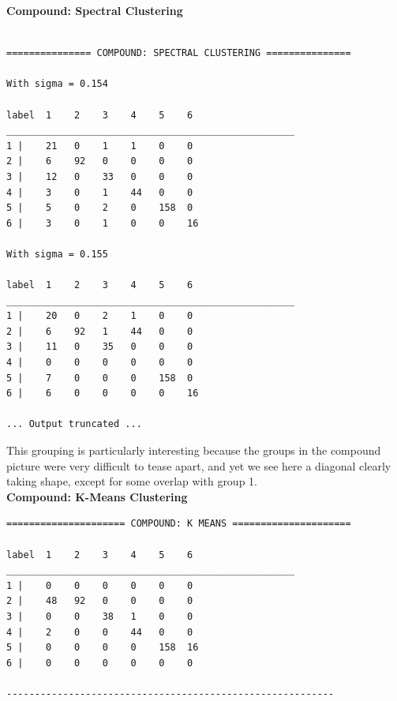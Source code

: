 \documentclass[11pt]{article}
\begin{document}
\textbf{Compound: Spectral Clustering} 
\begin{verbatim}

=============== COMPOUND: SPECTRAL CLUSTERING ===============

With sigma = 0.154

label  1    2    3    4    5    6    
___________________________________________________
1 |    21   0    1    1    0    0    
2 |    6    92   0    0    0    0    
3 |    12   0    33   0    0    0    
4 |    3    0    1    44   0    0    
5 |    5    0    2    0    158  0    
6 |    3    0    1    0    0    16    

With sigma = 0.155

label  1    2    3    4    5    6    
___________________________________________________
1 |    20   0    2    1    0    0    
2 |    6    92   1    44   0    0    
3 |    11   0    35   0    0    0    
4 |    0    0    0    0    0    0    
5 |    7    0    0    0    158  0    
6 |    6    0    0    0    0    16    

... Output truncated ... 	

\end{verbatim}
This grouping is particularly interesting because the groups in the compound picture were very difficult to tease apart, and yet we see here a diagonal clearly taking shape, except for some overlap with group 1.
\\[5pt]
\textbf{Compound: K-Means Clustering} 
\begin{verbatim}
===================== COMPOUND: K MEANS =====================

label  1    2    3    4    5    6    
___________________________________________________
1 |    0    0    0    0    0    0    
2 |    48   92   0    0    0    0    
3 |    0    0    38   1    0    0    
4 |    2    0    0    44   0    0    
5 |    0    0    0    0    158  16    
6 |    0    0    0    0    0    0    

----------------------------------------------------------

\end{verbatim}
\end{document}
